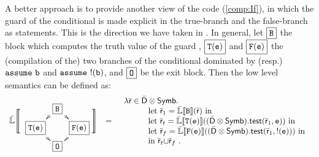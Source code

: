 \documentclass{llncs}
\newcommand{\comment}[1]{}
\begin{document}
\comment{
\begin{figure}[t]
  \[
  \xymatrix @-1.2pc  {
    &\fbox{$\begin{array}{rl}&\Compexp(\code{e}) \\  k:& \code{b} \takes \result == 0 \end{array}$} \ar[dr] \ar[dl] \\
    \fbox{$\begin{array}{rl} &\Assume \code{b} \\ &\Comp(\Stm_1) \end{array}$}\ar[dr]&  &\fbox{$\begin{array}{rl} &\Assume \code{!(b)} \\ &\Comp(\Stm_2) \end{array}$} \ar[dl]  \\
    &\fbox{$\mathit{out}: \Nop$} &
  }
  \]
  \caption{The enhanced control flow graph constructed from $\Comp( \If(\code{e})~\allowbreak \{ \Stm_1 \} \allowbreak \Else~\{ \allowbreak \Stm_2\allowbreak \}; )$, in which the assumptions at the head of the conditional branches are made explicits.}
  \label{fig:cfgIf2}
\end{figure}
}

A better approach is to provide another view of the code
(\ref{comp:If}), in which the guard of the conditional is made
explicit in the true-branch and the false-branch as 
statements.  This is the direction
we have taken in \Clousot{}.  In general, let $\fbox{\ensuremath{\mathtt{B}}}$
the block which computes the truth value of the guard ,
$\fbox{\ensuremath{\mathtt{T(e)}}}$ and $\fbox{\ensuremath{\mathtt{F(e)}}}$ the (compilation of the)
two branches of the conditional dominated by (resp.) $\mathtt{assume}~
\mathtt{b}$ and $\mathtt{assume}~ \mathtt{!(b)}$, and $\fbox{\ensuremath{\mathtt{O}}}$ be the exit
block.  Then the low level semantics can be defined as:
\begin{equation}
\def\objectstyle{\scriptstyle}
\def\labelstyle{\scriptstyle}
\begin{array}{l c l}
  \BigLLSem{\raisebox{0.6cm}
    {
      \xymatrix @-1.8pc  {
        &\fbox{\code{B}} \ar[dl] \ar[dr]& \\
        \fbox{\code{T(e)}} \ar[dr]& & \fbox{\code{F(e)}}\ar[dl] \\
        & \fbox{\code{O}} &
      }
    }
  } & = & 
  \begin{array}{l}
    \lambda \ael{r} \in \adom{D} \otimes \Symbolic.\ \\
    \quad \quad \quad \mathrm{let}\ \ael{r}_1 = \LLSem{\code{B}}(\ael{r})\ \mathrm{in} \\
    \quad \quad \quad \mathrm{let}\ \ael{r}_t = \LLSem{\code{T(e)}}((\adom{D} \otimes \Symbolic).\atest(\ael{r}_1, \code{e}))\ \mathrm{in} \\
    \quad \quad \quad \mathrm{let}\ \ael{r}_f =  \LLSem{\code{F(e)}}((\adom{D} \otimes \Symbolic).\atest(\ael{r}_1, \code{!(e)}))\ \mathrm{in}\\
    \quad \quad \quad \mathrm{in}\ \ael{r}_t \acup \ael{r}_f \ . 
  \end{array}
\end{array}
\end{equation}
\end{document}
